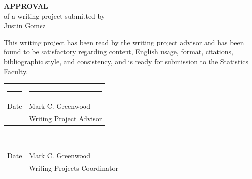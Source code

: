 \documentclass[12pt]{article}\usepackage[]{graphicx}\usepackage[]{color}
\begin{document}
\begin{titlepage}
\null
\vspace{1.in}
\begin{center}
{\bf\huge APPROVAL}\\[1.in]
of a writing project submitted by\\[.25in]
Justin Gomez \\[1.in]
\end{center}
\noindent
This writing project has been read by the writing project advisor and
has been found to be satisfactory regarding content, English usage,
format, citations, bibliographic style, and consistency, and is ready
for submission to the Statistics Faculty.

\vspace{.3in}
\begin{center}
\begin{tabular}{ll}
\rule{2.75in}{.03in} & \rule{2.75in}{.03in} \\
Date& Mark C. Greenwood \\
& Writing Project Advisor \\
\end{tabular}
\end{center}

\vspace{1cm}

\begin{center}
\begin{tabular}{ll}
\rule{2.75in}{.03in} & \rule{2.75in}{.03in} \\
Date& Mark C. Greenwood \\
& Writing Projects Coordinator \\
\end{tabular}
\end{center}

\end{titlepage}

\newpage
\tableofcontents
\newpage
\end{document}

